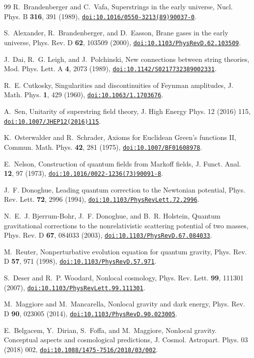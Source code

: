 \documentclass[a4paper,11pt]{article}
\newcommand{\doilink}[1]{\href{https://doi.org/#1}{\nolinkurl{doi:#1}}}
\begin{document}
\begin{thebibliography}{99}
R.~Brandenberger and C.~Vafa, Superstrings in the early universe, Nucl. Phys. B \textbf{316}, 391 (1989), \doilink{10.1016/0550-3213(89)90037-0}.

S.~Alexander, R.~Brandenberger, and D.~Easson, Brane gases in the early universe, Phys. Rev. D \textbf{62}, 103509 (2000), \doilink{10.1103/PhysRevD.62.103509}.

J.~Dai, R.~G. Leigh, and J.~Polchinski, New connections between string theories, Mod. Phys. Lett. A \textbf{4}, 2073 (1989), \doilink{10.1142/S0217732389002331}.

R.~E. Cutkosky, Singularities and discontinuities of Feynman amplitudes, J. Math. Phys. \textbf{1}, 429 (1960), \doilink{10.1063/1.1703676}.

A.~Sen, Unitarity of superstring field theory, J. High Energy Phys. 12 (2016) 115, \doilink{10.1007/JHEP12(2016)115}.

K.~Osterwalder and R.~Schrader, Axioms for Euclidean Green's functions II, Commun. Math. Phys. \textbf{42}, 281 (1975), \doilink{10.1007/BF01608978}.

E.~Nelson, Construction of quantum fields from Markoff fields, J. Funct. Anal. \textbf{12}, 97 (1973), \doilink{10.1016/0022-1236(73)90091-8}.

J.~F. Donoghue, Leading quantum correction to the Newtonian potential, Phys. Rev. Lett. \textbf{72}, 2996 (1994), \doilink{10.1103/PhysRevLett.72.2996}.

N.~E.~J. Bjerrum-Bohr, J.~F. Donoghue, and B.~R. Holstein, Quantum gravitational corrections to the nonrelativistic scattering potential of two masses, Phys. Rev. D \textbf{67}, 084033 (2003), \doilink{10.1103/PhysRevD.67.084033}.

M.~Reuter, Nonperturbative evolution equation for quantum gravity, Phys. Rev. D \textbf{57}, 971 (1998), \doilink{10.1103/PhysRevD.57.971}.

S.~Deser and R.~P. Woodard, Nonlocal cosmology, Phys. Rev. Lett. \textbf{99}, 111301 (2007), \doilink{10.1103/PhysRevLett.99.111301}.

M.~Maggiore and M.~Mancarella, Nonlocal gravity and dark energy, Phys. Rev. D \textbf{90}, 023005 (2014), \doilink{10.1103/PhysRevD.90.023005}.

E.~Belgacem, Y.~Dirian, S.~Foffa, and M.~Maggiore, Nonlocal gravity. Conceptual aspects and cosmological predictions, J. Cosmol. Astropart. Phys. 03 (2018) 002, \doilink{10.1088/1475-7516/2018/03/002}.

\end{thebibliography}
\end{document}
